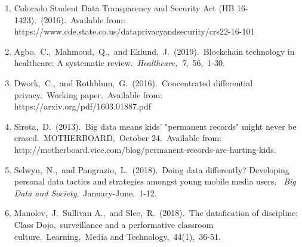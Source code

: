 \documentclass{article}
\begin{document}
\begin{enumerate}
    \label{43}
    \item Colorado Student Data Transparency and Security Act (HB 16-1423).\ (2016).\ Available from: https://www.cde.state.co.us/dataprivacyandsecurity/crs22-16-101
    \label{44}
    \item Agbo,\ C.,\ Mahmoud,\ Q.,\ and Eklund,\ J.\ (2019).\ Blockchain technology in healthcare: A systematic review.\ \textit{Healthcare,\ 7},\ 56,\ 1-30.
    \label{45}
    \item Dwork,\ C.,\ and Rothblum,\ G.\ (2016).\ Concentrated differential privacy.\ Working paper.\ Available from: https://arxiv.org/pdf/1603.01887.pdf
    \label{46}
    \item Sirota,\ D.\ (2013).\ Big data means kids' "permanent records" might never be erased.\ MOTHERBOARD,\ October 24.\ Available from: http://motherboard.vice.com/blog/permanent-records-are-hurting-kids.
    \label{47}
    \item Selwyn,\ N.,\ and Pangrazio,\ L.\ (2018).\ Doing data differently? Developing personal data tactics and strategies amongst young mobile media users.\ \textit{ Big Data and Society},\ January-June,\ 1-12.
    \label{48}
    \item Manolev,\ J.\ Sullivan A.,\ and Slee,\ R.\ (2018).\ The datafication of discipline: Class Dojo,\ surveillance and a performative classroom culture.\ Learning,\ Media and Technology,\ 44(1),\ 36-51.
\end{enumerate}
\end{document}
